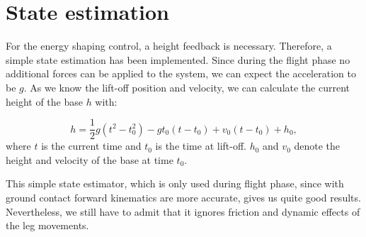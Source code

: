\documentclass[onecolumn, letter paper]{report}
\begin{document}




\chapter{State estimation}
For the energy shaping control, a height feedback is necessary. Therefore, a simple state estimation has been implemented. Since during the flight phase no additional forces can be applied to the system, we can expect the acceleration to be $g$. As we know the lift-off position and velocity, we can calculate the current height of the base $h$ with:
    
\begin{equation}
    h = \frac{1}{2} g (t^2 - t_0^2) - g t_0 (t - t_0) + v_0 (t - t_0) + h_0,
\end{equation}
where $t$ is the current time and  $t_0$ is the time at lift-off. $h_0$ and  $v_0$ denote the height and  velocity of the base at time $t_0$.

This simple state estimator, which is only used during flight phase, since with ground contact forward kinematics are more accurate, gives us quite good results. Nevertheless, we still have to admit that it ignores friction and dynamic effects of the leg movements.
\end{document}

